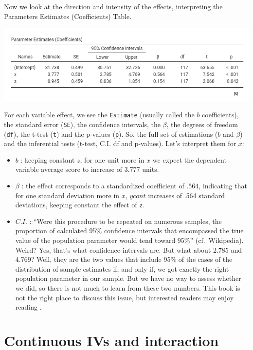 \documentclass[
]{book}
\providecommand{\tightlist}{%
  \setlength{\itemsep}{0pt}\setlength{\parskip}{0pt}}
\begin{document}
Now we look at the direction and intensity of the effects, interpreting the {Parameters Estimates (Coefficients)} Table.

\includegraphics[width=8.93in]{bookletpics/2_output9}

For each variable effect, we see the \texttt{Estimate} (usually called the \(b\) coefficients), the standard error (\texttt{SE}), the confidence intervals, the \(\beta\), the degrees of freedom (\texttt{df}), the t-test (\texttt{t}) and the p-values (\texttt{p}). So, the full set of estimations (\(b\) and \(\beta\)) and the inferential tests (t-test, C.I. df and p-values). Let's interpret them for \(x\):

\begin{itemize}
\tightlist
\item
  \(b\) : keeping constant \(z\), for one unit more in \(x\) we expect the dependent variable average score to increase of \(3.777\) units.
\item
  \(\beta\) : the effect corresponds to a standardized coefficient of \(.564\), indicating that for one standard deviation more in \(x\), \(ycont\) increases of .564 standard deviations, keeping constant the effect of \texttt{z}.
\item
  \(C.I.\) : ``Were this procedure to be repeated on numerous samples, the proportion of calculated 95\% confidence intervals that encompassed the true value of the population parameter would tend toward 95\%'' (cf.~Wikipedia). Weird? Yes, that's what confidence intervals are. But what about 2.785 and 4.769? Well, they are the two values that include 95\% of the cases of the distribution of sample estimates if, and only if, we got exactly the right population parameter in our sample. But we have no way to assess whether we did, so there is not much to learn from these two numbers. This book is not the right place to discuss this issue, but interested readers may enjoy reading \citet{mayoci}.
\end{itemize}

\hypertarget{moderation}{%
\section{Continuous IVs and interaction}\label{moderation}}
\end{document}
